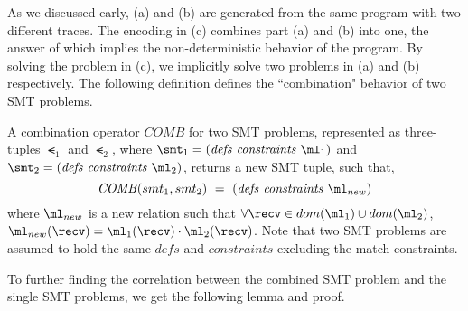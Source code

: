  As we discussed early,  (a) and (b) are generated from the same program with two different traces. The encoding in  (c) combines part (a) and (b) into one, the answer of which implies the non-deterministic behavior of the program. By solving the problem in  (c), we implicitly solve two problems in  (a) and (b) respectively. The following definition defines the ``combination" behavior of two SMT problems.



\begin{definition}
A combination operator $\mathit{COMB}$ for two SMT problems, represented as three-tuples $\smt_1$ and $\smt_2$, where $\smt_1 = (\mathit{defs}\ \mathit{constraints}\ \ml_1)$ and $\smt_2 = (\mathit{defs}\ \mathit{constraints}\ \ml_2)$, returns a new SMT tuple, such that,
\[\mathit{COMB}(smt_1,smt_2)\ =\ (\mathit{defs}\ \mathit{constraints}\ \ml_{new})\]
where $\ml_{new}$ is a new relation such that $\forall\recv\in dom(\ml_1)\cup dom(\ml_2)$, $\ml_{new}(\recv) = \ml_1(\recv)\cdot\ml_2(\recv)$. Note that two SMT problems are assumed to hold the same $\mathit{defs}$ and $\mathit{constraints}$ excluding the match constraints.
\label{def:combinator}
\end{definition}

To further finding the correlation between the combined SMT problem and the single SMT problems, we get the following lemma and proof.

